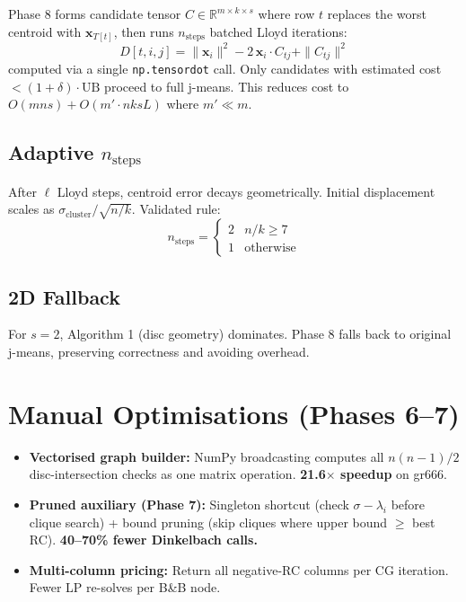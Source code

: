 \documentclass[12pt,a4paper]{article}
\begin{document}
Phase 8 forms candidate tensor $C \in \mathbb{R}^{m \times k \times s}$ where row $t$ replaces the worst centroid with $\mathbf{x}_{T[t]}$, then runs $n_\text{steps}$ batched Lloyd iterations:
\[
  D[t,i,j] = \|\mathbf{x}_i\|^2 - 2\,\mathbf{x}_i \cdot C_{tj} + \|C_{tj}\|^2
\]
computed via a single \texttt{np.tensordot} call. Only candidates with estimated cost $< (1+\delta)\cdot\text{UB}$ proceed to full j-means. This reduces cost to $O(mns) + O(m' \cdot nksL)$ where $m' \ll m$.

\subsection{Adaptive $n_\text{steps}$}

After $\ell$ Lloyd steps, centroid error decays geometrically. Initial displacement scales as $\sigma_\text{cluster}/\sqrt{n/k}$. Validated rule:
\[
  n_\text{steps} = \begin{cases} 2 & n/k \geq 7 \\ 1 & \text{otherwise} \end{cases}
\]

\subsection{2D Fallback}

For $s=2$, Algorithm 1 (disc geometry) dominates. Phase 8 falls back to original j-means, preserving correctness and avoiding overhead.

\section{Manual Optimisations (Phases 6--7)}

\begin{itemize}
  \item \textbf{Vectorised graph builder:} NumPy broadcasting computes all $n(n-1)/2$ disc-intersection checks as one matrix operation. \textbf{21.6$\times$ speedup} on gr666.
  \item \textbf{Pruned auxiliary (Phase 7):} Singleton shortcut (check $\sigma - \lambda_i$ before clique search) + bound pruning (skip cliques where upper bound $\geq$ best RC). \textbf{40--70\% fewer Dinkelbach calls.}
  \item \textbf{Multi-column pricing:} Return all negative-RC columns per CG iteration. Fewer LP re-solves per B\&B node.
\end{itemize}
\end{document}
